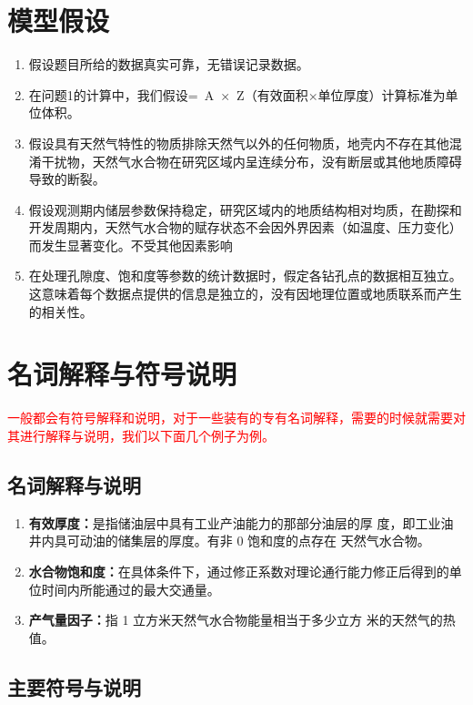 \documentclass[12pt,a4paper]{nmmcm}
\newcommand\wordc[1]{\textbf{#1}}
\begin{document}
\section{模型假设}
\begin{enumerate}
  \item 假设题目所给的数据真实可靠，无错误记录数据。
  \item 在问题1的计算中，我们假设= A × Z（有效面积×单位厚度）计算标准为单位体积。
  \item 假设具有天然气特性的物质排除天然气以外的任何物质，地壳内不存在其他混淆干扰物，天然气水合物在研究区域内呈连续分布，没有断层或其他地质障碍导致的断裂。
  \item 假设观测期内储层参数保持稳定，研究区域内的地质结构相对均质，在勘探和开发周期内，天然气水合物的赋存状态不会因外界因素（如温度、压力变化）而发生显著变化。不受其他因素影响
  \item 在处理孔隙度、饱和度等参数的统计数据时，假定各钻孔点的数据相互独立。这意味着每个数据点提供的信息是独立的，没有因地理位置或地质联系而产生的相关性。
\end{enumerate}

\section{名词解释与符号说明}

\textcolor{red}{一般都会有符号解释和说明，对于一些装有的专有名词解释，需要的时候就需要对其进行解释与说明，我们以下面几个例子为例。}

\subsection{名词解释与说明}
\begin{enumerate}
  \item \wordc{有效厚度：}是指储油层中具有工业产油能力的那部分油层的厚
        度，即工业油井内具可动油的储集层的厚度。有非 0 饱和度的点存在
        天然气水合物。
  \item \wordc{水合物饱和度：}在具体条件下，通过修正系数对理论通行能力修正后得到的单
        位时间内所能通过的最大交通量。
  \item \wordc{产气量因子：}指 1 立方米天然气水合物能量相当于多少立方
        米的天然气的热值。

\end{enumerate}

\subsection{主要符号与说明}
\end{document}
